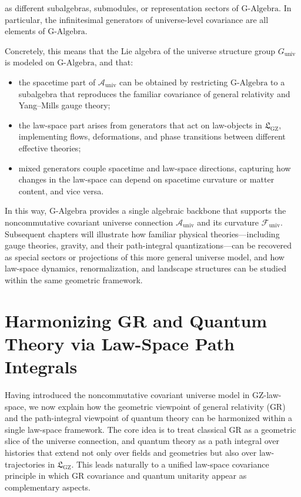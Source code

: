 \documentclass[11pt]{book}
\newcommand{\GAlgebra}{\text{G-Algebra}}
\newcommand{\GZLS}{\ensuremath{\mathfrak{L}_{\mathrm{GZ}}}}
\theoremstyle{plain}
\theoremstyle{definition}
\theoremstyle{remark}
\begin{document}
as different subalgebras, submodules, or representation sectors of
$\GAlgebra$. In particular, the infinitesimal generators of
universe-level covariance are all elements of $\GAlgebra$.

Concretely, this means that the Lie algebra of the universe
structure group $G_{\mathrm{univ}}$ is modeled on $\GAlgebra$, and
that:

\begin{itemize}
  \item the spacetime part of $\mathcal{A}_{\mathrm{univ}}$ can be
        obtained by restricting $\GAlgebra$ to a subalgebra that
        reproduces the familiar covariance of general relativity and
        Yang--Mills gauge theory;
  \item the law-space part arises from generators that act on
        law-objects in $\GZLS$, implementing flows, deformations,
        and phase transitions between different effective theories;
  \item mixed generators couple spacetime and law-space directions,
        capturing how changes in the law-space can depend on
        spacetime curvature or matter content, and vice versa.
\end{itemize}

In this way, $\GAlgebra$ provides a single algebraic backbone that
supports the noncommutative covariant universe connection
$\mathcal{A}_{\mathrm{univ}}$ and its curvature
$\mathcal{F}_{\mathrm{univ}}$. Subsequent chapters will illustrate
how familiar physical theories---including gauge theories,
gravity, and their path-integral quantizations---can be recovered
as special sectors or projections of this more general universe
model, and how law-space dynamics, renormalization, and landscape
structures can be studied within the same geometric framework.



\section{Harmonizing GR and Quantum Theory via Law-Space Path Integrals}
\label{sec:gr-qt-harmonization-lawspace}


Having introduced the noncommutative covariant universe model in
GZ-law-space, we now explain how the geometric viewpoint of general
relativity (GR) and the path-integral viewpoint of quantum theory
can be harmonized within a single law-space framework. The core idea
is to treat classical GR as a geometric slice of the universe
connection, and quantum theory as a path integral over histories
that extend not only over fields and geometries but also over
law-trajectories in $\GZLS$. This leads naturally to a unified
law-space covariance principle in which GR covariance and quantum
unitarity appear as complementary aspects.
\end{document}
